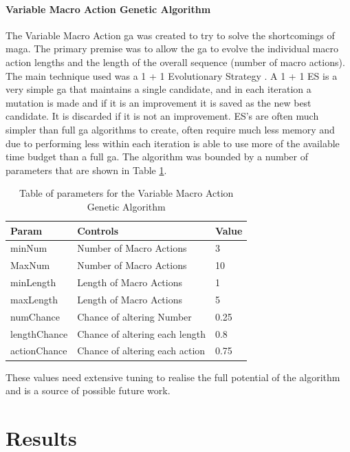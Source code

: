 \documentclass{IEEEtran}
\begin{document}
\paragraph{Variable Macro Action Genetic Algorithm}
The Variable Macro Action \gls{ga} was created to try to solve the shortcomings of \gls{maga}. The primary premise was to allow the \gls{ga} to evolve the individual macro action lengths and the length of the overall sequence (number of macro actions). The main technique used was a 1 + 1 Evolutionary Strategy \cite{t.back2000evolutionary-co}. A 1 + 1 ES is a very simple \gls{ga} that maintains a single candidate, and in each iteration a mutation is made and if it is an improvement it is saved as the new best candidate. It is discarded if it is not an improvement. ES's are often much simpler than full \gls{ga} algorithms to create, often require much less memory and due to performing less within each iteration is able to use more of the available time budget than a full \gls{ga}. The algorithm was bounded by a number of parameters that are shown in Table \ref{vmagaTable}.
\begin{table}[!t]
\begin{center}
\begin{tabular}{| l | l | l |}
\hline
\textbf{Param} & \textbf{Controls} & \textbf{Value} \\
\hline
minNum & Number of Macro Actions & 3 \\
MaxNum & Number of Macro Actions & 10 \\
minLength & Length of Macro Actions & 1 \\
maxLength & Length of Macro Actions & 5 \\
numChance & Chance of altering Number & 0.25 \\
lengthChance & Chance of altering each length & 0.8 \\
actionChance & Chance of altering each action & 0.75 \\
\hline
\end{tabular}
\caption{Table of parameters for the Variable Macro Action Genetic Algorithm}
\label{vmagaTable}
\end{center}
\end{table}
These values need extensive tuning to realise the full potential of the algorithm and is a source of possible future work.
\section{Results}
\end{document}
